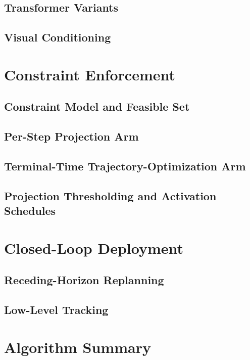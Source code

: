 \documentclass[headsepline,footsepline,footinclude=false,oneside,fontsize=11pt,paper=a4,listof=totoc,bibliography=totoc]{scrbook}
\begin{document}
\subsection{Transformer Variants}\label{sec:method:backbone:transformer}
\subsection{Visual Conditioning}\label{sec:method:backbone:visual}

\section{Constraint Enforcement}\label{sec:method:constraints}
\subsection{Constraint Model and Feasible Set}\label{sec:method:constraints:sets}
\subsection{Per-Step Projection Arm}\label{sec:method:constraints:projection}
\subsection{Terminal-Time Trajectory-Optimization Arm}\label{sec:method:constraints:hardflow}
\subsection{Projection Thresholding and Activation Schedules}\label{sec:method:constraints:schedule}

\section{Closed-Loop Deployment}\label{sec:method:closedloop}
\subsection{Receding-Horizon Replanning}\label{sec:method:closedloop:replan}
\subsection{Low-Level Tracking}\label{sec:method:closedloop:tracking}

\section{Algorithm Summary}\label{sec:method:algorithm}
\end{document}

